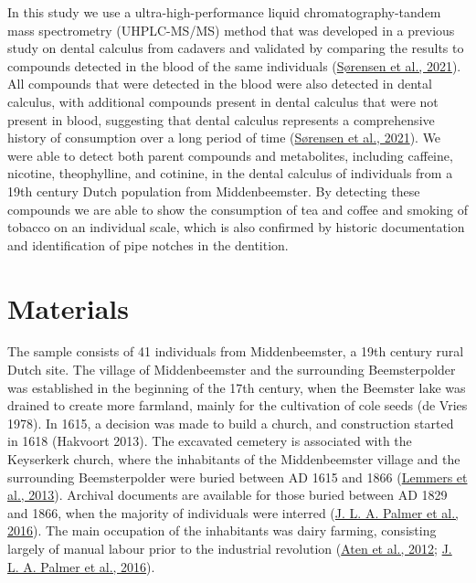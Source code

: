 \documentclass[
  letterpaper,
]{book}
\begin{document}
In this study we use a ultra-high-performance liquid
chromatography-tandem mass spectrometry (UHPLC-MS/MS) method that was
developed in a previous study on dental calculus from cadavers and
validated by comparing the results to compounds detected in the blood of
the same individuals
(\protect\hyperlink{ref-sorensenDrugsCalculus2021}{Sørensen et al.,
2021}). All compounds that were detected in the blood were also detected
in dental calculus, with additional compounds present in dental calculus
that were not present in blood, suggesting that dental calculus
represents a comprehensive history of consumption over a long period of
time (\protect\hyperlink{ref-sorensenDrugsCalculus2021}{Sørensen et al.,
2021}). We were able to detect both parent compounds and metabolites,
including caffeine, nicotine, theophylline, and cotinine, in the dental
calculus of individuals from a 19th century Dutch population from
Middenbeemster. By detecting these compounds we are able to show the
consumption of tea and coffee and smoking of tobacco on an individual
scale, which is also confirmed by historic documentation and
identification of pipe notches in the dentition.

\hypertarget{mb11CalculusPilot-mat}{%
\section{Materials}\label{mb11CalculusPilot-mat}}

The sample consists of 41 individuals from Middenbeemster, a 19th
century rural Dutch site. The village of Middenbeemster and the
surrounding Beemsterpolder was established in the beginning of the 17th
century, when the Beemster lake was drained to create more farmland,
mainly for the cultivation of cole seeds (de Vries 1978). In 1615, a
decision was made to build a church, and construction started in 1618
(Hakvoort 2013). The excavated cemetery is associated with the
Keyserkerk church, where the inhabitants of the Middenbeemster village
and the surrounding Beemsterpolder were buried between AD 1615 and 1866
(\protect\hyperlink{ref-lemmersMiddenbeemster2013}{Lemmers et al.,
2013}). Archival documents are available for those buried between AD
1829 and 1866, when the majority of individuals were interred
(\protect\hyperlink{ref-palmerActivityReconstruction2016}{J. L. A.
Palmer et al., 2016}). The main occupation of the inhabitants was dairy
farming, consisting largely of manual labour prior to the industrial
revolution (\protect\hyperlink{ref-aten400Jaar2012}{Aten et al., 2012};
\protect\hyperlink{ref-palmerActivityReconstruction2016}{J. L. A. Palmer
et al., 2016}).
\end{document}
